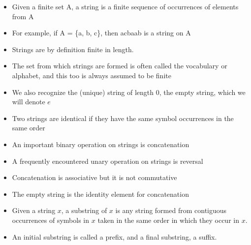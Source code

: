 \documentclass{beamer}
\begin{document}
	\begin{frame}
		\begin{itemize}
			\item Given a finite set A, a string is a finite sequence of occurrences of elements from A
			\item For example, if A = \{a, b, c\}, then acbaab is a string on A
		\end{itemize}
	\end{frame}


	\begin{frame}
		\begin{itemize}
			\item Strings are by definition finite in length.
			\item The set from which strings are formed is often called the vocabulary or alphabet, and this too is always assumed to be finite
			\item We also recognize the (unique) string of length $0$, the empty string, which we will denote $e$
			\item Two strings are identical if they have the same symbol occurrences in the same order
		\end{itemize}
	\end{frame}


	\begin{frame}
		\begin{itemize}
			\item An important binary operation on strings is concatenation
			\item A frequently encountered unary operation on strings is reversal
		\end{itemize}
	\end{frame}


	\begin{frame}
		\begin{itemize}
			\item Concatenation is associative but it is not commutative
			\item The empty string is the identity element for concatenation
		\end{itemize}
	\end{frame}


	\begin{frame}
		\begin{itemize}
			\item Given a string $x$, a substring of $x$ is any string formed from contiguous occurrences of symbols in $x$ taken in the same order in which they occur in $x$.
			\item An initial substring is called a prefix, and a final substring, a suffix.
		\end{itemize}
	\end{frame}
\end{document}
